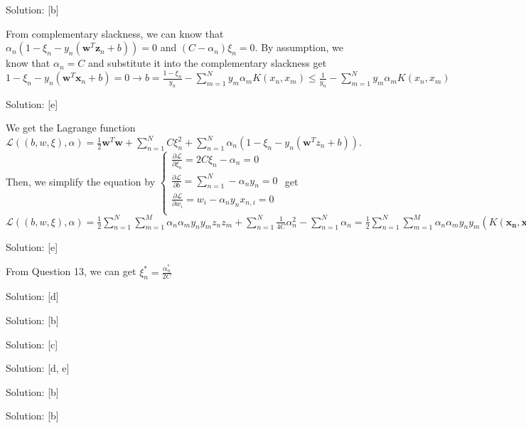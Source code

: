 \documentclass{../../Latex_Template/Homework/homework}
\begin{document}
\newpage


\question
Solution: [b]

From complementary slackness, we can know that $\alpha_{n} (1 - \xi_{n} -
y_{n} (\mathbf{w}^{T} \mathbf{z}_{n} + b)) = 0$ and $ (C - \alpha_{n}) \xi_{n}
= 0$. By assumption, we know that $\alpha_{n} = C$ and substitute it into the
complementary slackness get $1 - \xi_{n} - y_{n} (\mathbf{w}^{T}
\mathbf{x}_{n} + b) = 0 \rightarrow b = \frac{1 - \xi_{n}}{y_{n}} -
\sum_{m = 1}^{N} y_{m} \alpha_{m} K(x_{n}, x_{m}) \leq \frac{1}{y_{n}} -
\sum_{m = 1}^{N} y_{m} \alpha_{m} K(x_{n}, x_{m})$


\question
Solution: [e]

We get the Lagrange function $\mathcal{L}((b, w, \xi), \alpha) = \frac{1}{2}
\mathbf{w}^{T} \mathbf{w} + \sum_{n = 1}^{N}C\xi_{n}^{2} + \sum_{n = 1}^{N}
\alpha_{n} (1 - \xi_{n} -y_{n}(\mathbf{w}^{T} z_{n} + b))$. Then, we simplify
the equation by
$
\left\{
	\begin{array}{ll}
    \frac{\partial \mathcal{L}}{\partial \xi_{n}} = 
    2C\xi_{n} - \alpha_{n} = 0 \\
    \frac{\partial \mathcal{L}}{\partial b} = 
    \sum_{n = 1}^{N} -\alpha_{n} y_{n} = 0 \\
    \frac{\partial \mathcal{L}}{\partial w_{i}} = 
    w_{i} - \alpha_{n} y_{n} x_{n, i} = 0 \\
 	\end{array}
\right.
$
get $\mathcal{L}((b, w, \xi), \alpha) = \frac{1}{2} \sum_{n = 1}^{N}
\sum_{m = 1}^{M} \alpha_{n} \alpha_{m} y_{n} y_{m} z_{n} z_{m} +
\sum_{n = 1}^{N} \frac{1}{4C} \alpha_{n}^{2} - \sum_{n = 1}^{N} \alpha_{n} = 
\frac{1}{2} \sum_{n = 1}^{N} \sum_{m = 1}^{M} \alpha_{n} \alpha_{m} y_{n} y_{m} 
(K(\mathbf{x_{n}}, \mathbf{x_{m}}) + \frac{1}{2C} \llbracket n = m \rrbracket)$


\question
Solution: [e]

From Question 13, we can get $\xi_{n}^{*} = \frac{\alpha_{n}^{*}}{2C}$


\question
Solution: [d]




\question
Solution: [b]




\question
Solution: [c]





\question
Solution: [d, e]




\question
Solution: [b]




\question
Solution: [b]


\end{document}
